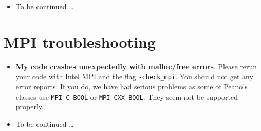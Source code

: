 \begin{itemize}
{    recognized''}. automake puts the actual executable into a \texttt{.libs}
    directory and creates bash scripts invoking those guys. Change into
    \texttt{.libs} and run gdb directly on the executable. Before you do so,
    ensure that \texttt{LD\_LIBRARY\_Path} points to the directory containing
    the libraries. Again, those guys are stored in a \texttt{.libs}
    subdirectory, so the library path should point to that subdirectory. 
  \item To be continued \dots
\end{itemize}
 
 
 
 



\section{MPI troubleshooting}
\begin{itemize}
  \item \textbf{My code crashes unexpectedly with malloc/free errors}. Please
  rerun your code with Intel MPI and the flag \texttt{-check\_mpi}. You should
  not get any error reports. If you do, we have had serious problems as some of
  Peano's classes use \texttt{MPI\_C\_BOOL} or \texttt{MPI\_CXX\_BOOL}. They
  seem not be supported properly.
  \item To be continued \dots
\end{itemize}



